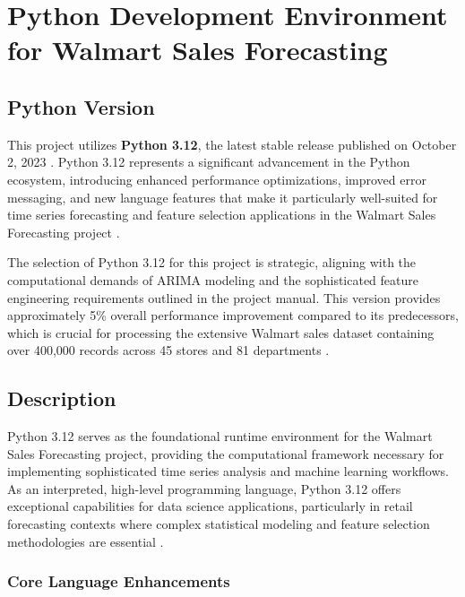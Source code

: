 %
%
%

\chapter{Python Development Environment for Walmart Sales Forecasting}

\section{Python Version}

This project utilizes \textbf{Python 3.12}, the latest stable release published on October 2, 2023 \cite{Box:2016}. Python 3.12 represents a significant advancement in the Python ecosystem, introducing enhanced performance optimizations, improved error messaging, and new language features that make it particularly well-suited for time series forecasting and feature selection applications in the Walmart Sales Forecasting project \cite{Montgomery:2008}.

The selection of Python 3.12 for this project is strategic, aligning with the computational demands of ARIMA modeling and the sophisticated feature engineering requirements outlined in the project manual. This version provides approximately 5\% overall performance improvement compared to its predecessors, which is crucial for processing the extensive Walmart sales dataset containing over 400,000 records across 45 stores and 81 departments \cite{Guyon:2003}.

\section{Description}

Python 3.12 serves as the foundational runtime environment for the Walmart Sales Forecasting project, providing the computational framework necessary for implementing sophisticated time series analysis and machine learning workflows. As an interpreted, high-level programming language, Python 3.12 offers exceptional capabilities for data science applications, particularly in retail forecasting contexts where complex statistical modeling and feature selection methodologies are essential \cite{Montgomery:2008}.

\subsection{Core Language Enhancements}

